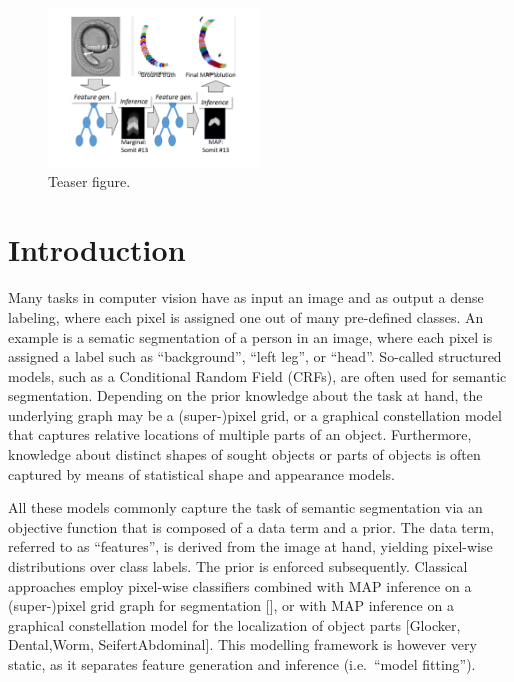 \documentclass[10pt,twocolumn,letterpaper]{article}
\begin{document}
\begin{figure}
\includegraphics[width=0.5\textwidth]{Teaser.png}
\caption{Teaser figure.}
\label{fig:teaser.}
\end{figure}


\section{Introduction}
Many tasks in computer vision have as input an image and as output a dense labeling, where each pixel is assigned one out of many pre-defined classes. An example is a sematic segmentation of a person in an image, where each pixel is assigned a label such as “background”, “left leg”, or “head”. 
%
So-called structured models, such as a Conditional Random Field (CRFs), are often used for semantic segmentation. 
Depending on the prior knowledge about the task at hand, the underlying graph may be a (super-)pixel grid, or a graphical constellation model that captures relative locations of multiple parts of an object. 
%
Furthermore, knowledge about distinct shapes of sought objects or parts of objects is often captured by means of statistical shape and appearance models. 

All these models commonly capture the task of semantic segmentation via an objective function that is composed of a data term and a prior. 
%
The data term, referred to as "`features"', is derived from the image at hand, yielding pixel-wise distributions over class labels. The prior is enforced subsequently. 
%
%
Classical approaches employ pixel-wise classifiers combined with MAP inference on a (super-)pixel grid graph for segmentation [], or with MAP inference on a graphical constellation model for the localization of object parts [Glocker, Dental,Worm, SeifertAbdominal].  
%
This modelling framework is however very static, as it separates feature generation and inference (i.e.\ "`model fitting"'). 
\end{document}
